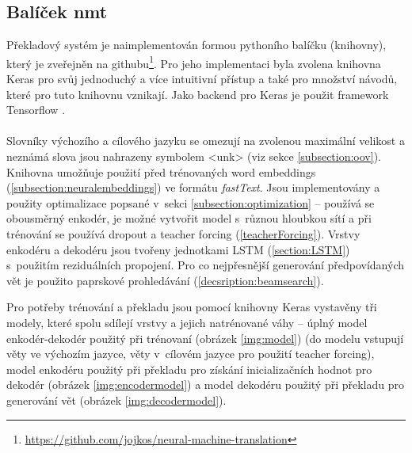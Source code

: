 \subsection{Balíček nmt}
Překladový systém je naimplementován formou pythoního balíčku (knihovny), který je zveřejněn na githubu\footnote{\url{https://github.com/jojkos/neural-machine-translation}}. Pro jeho implementaci byla zvolena knihovna Keras \cite{keras} pro svůj jednoduchý a více intuitivní přístup a také pro množství návodů, které pro tuto knihovnu vznikají. Jako backend pro Keras je použit framework Tensorflow \cite{tensorflow}.
\\\\
Slovníky výchozího a cílového jazyku se omezují na zvolenou maximální velikost a neznámá slova jsou nahrazeny symbolem <unk> (viz sekce \ref{subsection:oov}). Knihovna umožňuje použití před trénovaných word embeddings (\ref{subsection:neuralembeddings}) ve formátu \emph{fastText}. Jsou implementovány a použity optimalizace popsané v~sekci \ref{subsection:optimization} -- používá se obousměrný enkodér, je možné vytvořit model s~různou hloubkou sítí a při trénování se používá dropout a teacher forcing (\ref{teacherForcing}). Vrstvy enkodéru a dekodéru jsou tvořeny jednotkami LSTM (\ref{section:LSTM}) s~použitím reziduálních propojení. Pro co nejpřesnější generování předpovídaných vět je použito paprskové prohledávání (\ref{decsription:beamsearch}).

Pro potřeby trénování a překladu jsou pomocí knihovny Keras vystavěny tři modely, které spolu sdílejí vrstvy a jejich natrénované váhy -- úplný model enkodér-dekodér použitý při trénovaní (obrázek \ref{img:model}) (do modelu vstupují věty ve výchozím jazyce, věty v~cílovém jazyce pro použití teacher forcing), model enkodéru použitý při překladu pro získání inicializačních hodnot pro dekodér (obrázek \ref{img:encodermodel}) a model dekodéru použitý při překladu pro generování vět (obrázek \ref{img:decodermodel}).


